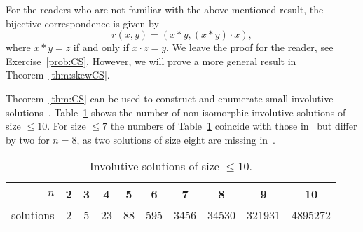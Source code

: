 For the readers who are not familiar with the above-mentioned result, 
the bijective correspondence is given by 
\[
r(x,y)=(x*y,(x*y)\cdot x),
\]
where $x*y=z$ if and only if $x\cdot z=y$. We leave the proof for the reader, see 
Exercise~\ref{prob:CS}. However, we will prove a more 
general result in Theorem~\ref{thm:skewCS}. 

Theorem~\ref{thm:CS} can be used to construct and enumerate small 
involutive solutions~\cite{AMV}. Table~\ref{tab:IYB} shows the 
number of non-isomorphic involutive solutions of size $\leq10$. 
For size $\leq7$ the numbers of Table~\ref{tab:IYB} coincide with those in~\cite{MR1722951}
but differ by two for $n=8$, as two solutions of size eight 
are missing in~\cite{MR1722951}. 

\begin{table}[H]
\centering
\caption{Involutive solutions of size $\leq10$.}
\begin{tabular}{|r|ccccccccc|}
\hline
$n$ & 2 & 3 & 4 & 5 & 6 & 7 & 8 & 9 & 10\tabularnewline
\hline 
solutions & 2 & 5 & 23 & 88 & 595 & 3456 & 34530 & 321931 & 4895272\tabularnewline
\hline
\end{tabular}
\label{tab:IYB}
\end{table}




